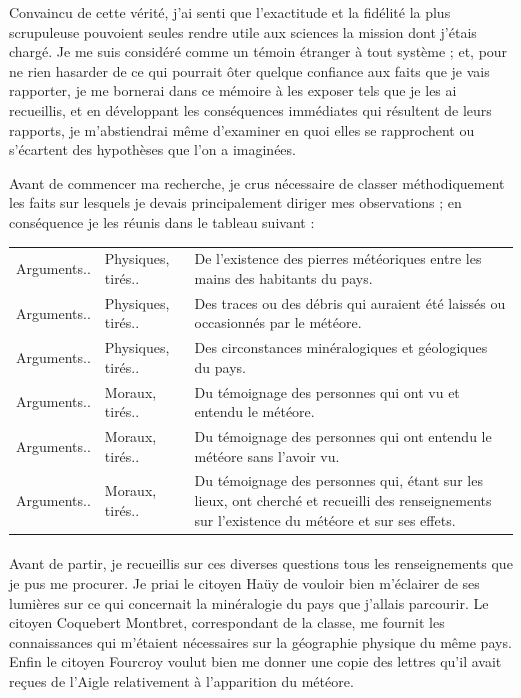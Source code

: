 \documentclass[a4paper, 11pt, oneside, polutonikogreek, french]{article}
\begin{document}
Convaincu de cette vérité, j'ai senti que l'exactitude et la fidélité la plus scrupuleuse pouvoient seules rendre utile aux sciences la mission dont j'étais chargé. Je me suis considéré comme un témoin étranger à tout système ; et, pour ne rien hasarder de ce qui pourrait ôter quelque confiance aux faits que je vais rapporter, je me bornerai dans ce mémoire à les exposer tels que je les ai recueillis, et en développant les conséquences immédiates qui résultent de leurs rapports, je m'abstiendrai même d'examiner en quoi elles se rapprochent ou s'écartent des hypothèses que l'on a imaginées.

Avant de commencer ma recherche, je crus nécessaire de classer méthodiquement les faits sur lesquels je devais principalement diriger mes observations ; en conséquence je les réunis dans le tableau suivant :
\begin{table}[H]
    \centering\small
    \begin{tabular}{l l p{52mm}}
        Arguments.. & Physiques, tirés.. & De l'existence des pierres météoriques entre les mains des habitants du pays.   \\
        Arguments.. & Physiques, tirés.. & Des traces ou des débris qui auraient été laissés ou occasionnés par le météore.   \\
        Arguments.. & Physiques, tirés.. & Des circonstances minéralogiques et géologiques du pays.   \\
        Arguments.. & Moraux, tirés.. & Du témoignage des personnes qui ont vu et entendu le météore.   \\
        Arguments.. & Moraux, tirés.. & Du témoignage des personnes qui ont entendu le météore sans l'avoir vu.   \\
        Arguments.. & Moraux, tirés.. & Du témoignage des personnes qui, étant sur les lieux, ont cherché et recueilli des renseignements sur l'existence du météore et sur ses effets. \\
    \end{tabular}
\end{table}
\paragraph{}
Avant de partir, je recueillis sur ces diverses questions tous les renseignements que je pus me procurer. Je priai le citoyen Haüy de vouloir bien m'éclairer de ses lumières sur ce qui concernait la minéralogie du pays que j'allais parcourir. Le citoyen Coquebert Montbret, correspondant de la classe, me fournit les connaissances qui m'étaient nécessaires sur la géographie physique du même pays. Enfin le citoyen Fourcroy voulut bien me donner une copie des lettres qu'il avait reçues de l'Aigle relativement à l'apparition du météore.
\end{document}
